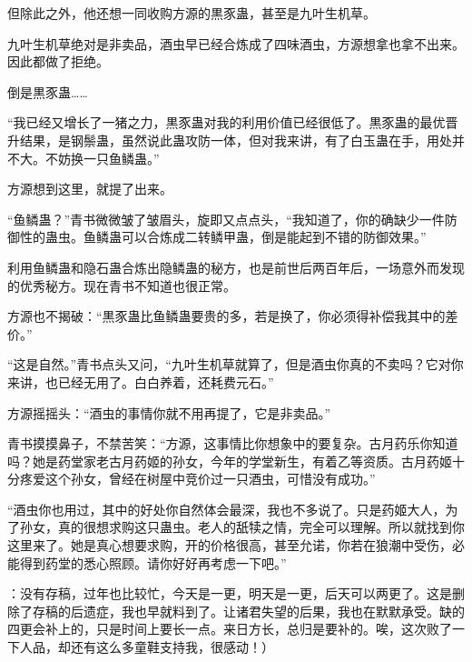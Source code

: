 \begin{this_body}
但除此之外，他还想一同收购方源的黒豕蛊，甚至是九叶生机草。

九叶生机草绝对是非卖品，酒虫早已经合炼成了四味酒虫，方源想拿也拿不出来。因此都做了拒绝。

倒是黒豕蛊……

“我已经又增长了一猪之力，黒豕蛊对我的利用价值已经很低了。黒豕蛊的最优晋升结果，是钢鬃蛊，虽然说此蛊攻防一体，但对我来讲，有了白玉蛊在手，用处并不大。不妨换一只鱼鳞蛊。”

方源想到这里，就提了出来。

“鱼鳞蛊？”青书微微皱了皱眉头，旋即又点点头，“我知道了，你的确缺少一件防御性的蛊虫。鱼鳞蛊可以合炼成二转鳞甲蛊，倒是能起到不错的防御效果。”

利用鱼鳞蛊和隐石蛊合炼出隐鳞蛊的秘方，也是前世后两百年后，一场意外而发现的优秀秘方。现在青书不知道也很正常。

方源也不揭破：“黒豕蛊比鱼鳞蛊要贵的多，若是换了，你必须得补偿我其中的差价。”

“这是自然。”青书点头又问，“九叶生机草就算了，但是酒虫你真的不卖吗？它对你来讲，也已经无用了。白白养着，还耗费元石。”

方源摇摇头：“酒虫的事情你就不用再提了，它是非卖品。”

青书摸摸鼻子，不禁苦笑：“方源，这事情比你想象中的要复杂。古月药乐你知道吗？她是药堂家老古月药姬的孙女，今年的学堂新生，有着乙等资质。古月药姬十分疼爱这个孙女，曾经在树屋中竞价过一只酒虫，可惜没有成功。”

“酒虫你也用过，其中的好处你自然体会最深，我也不多说了。只是药姬大人，为了孙女，真的很想求购这只蛊虫。老人的舐犊之情，完全可以理解。所以就找到你这里来了。她是真心想要求购，开的价格很高，甚至允诺，你若在狼潮中受伤，必能得到药堂的悉心照顾。请你好好再考虑一下吧。”

：没有存稿，过年也比较忙，今天是一更，明天是一更，后天可以两更了。这是删除了存稿的后遗症，我也早就料到了。让诸君失望的后果，我也在默默承受。缺的四更会补上的，只是时间上要长一点。来日方长，总归是要补的。唉，这次败了一下人品，却还有这么多童鞋支持我，很感动！）

\end{this_body}

